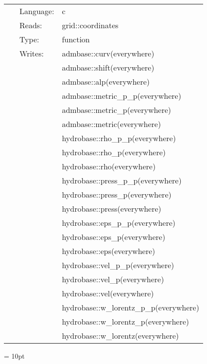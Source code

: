  \begin{tabular*}{160mm}{cll} 
~ & Language:  & c \\ 
~ & Reads:  & grid::coordinates \\ 
~ & Type:  & function \\ 
~ & Writes:  & admbase::curv(everywhere) \\ 
~& ~ &admbase::shift(everywhere)\\ 
~& ~ &admbase::alp(everywhere)\\ 
~& ~ &admbase::metric\_p\_p(everywhere)\\ 
~& ~ &admbase::metric\_p(everywhere)\\ 
~& ~ &admbase::metric(everywhere)\\ 
~& ~ &hydrobase::rho\_p\_p(everywhere)\\ 
~& ~ &hydrobase::rho\_p(everywhere)\\ 
~& ~ &hydrobase::rho(everywhere)\\ 
~& ~ &hydrobase::press\_p\_p(everywhere)\\ 
~& ~ &hydrobase::press\_p(everywhere)\\ 
~& ~ &hydrobase::press(everywhere)\\ 
~& ~ &hydrobase::eps\_p\_p(everywhere)\\ 
~& ~ &hydrobase::eps\_p(everywhere)\\ 
~& ~ &hydrobase::eps(everywhere)\\ 
~& ~ &hydrobase::vel\_p\_p(everywhere)\\ 
~& ~ &hydrobase::vel\_p(everywhere)\\ 
~& ~ &hydrobase::vel(everywhere)\\ 
~& ~ &hydrobase::w\_lorentz\_p\_p(everywhere)\\ 
~& ~ &hydrobase::w\_lorentz\_p(everywhere)\\ 
~& ~ &hydrobase::w\_lorentz(everywhere)\\ 
\end{tabular*} 



\vspace{5mm}\parskip = 10pt 
